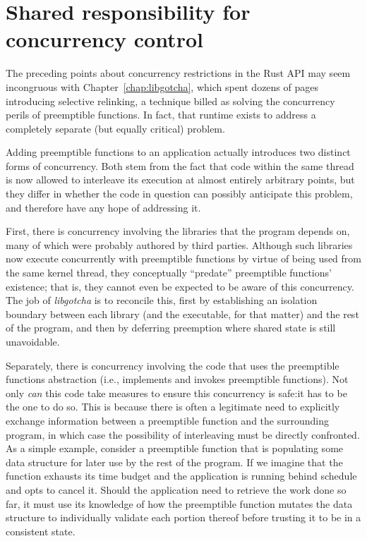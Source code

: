 \section{Shared responsibility for concurrency control}

The preceding points about concurrency restrictions in the Rust API may seem
incongruous with Chapter~\ref{chap:libgotcha}, which spent dozens of pages
introducing selective relinking, a technique billed as solving the concurrency perils
of preemptible functions.  In fact, that runtime exists to address a completely
separate (but equally critical) problem.

Adding preemptible functions to an application actually introduces two distinct forms
of concurrency.  Both stem from the fact that code within the same thread is now
allowed to interleave its execution at almost entirely arbitrary points, but they
differ in whether the code in question can possibly anticipate this problem, and
therefore have any hope of addressing it.

First, there is concurrency involving the libraries that the program depends on, many
of which were probably authored by third parties.  Although such libraries now
execute concurrently with preemptible functions by virtue of being used from the same
kernel thread, they conceptually ``predate'' preemptible functions' existence; that
is, they cannot even be expected to be aware of this concurrency.  The job of
\textit{libgotcha} is to reconcile this, first by establishing an isolation boundary
between each library (and the executable, for that matter) and the rest of the
program, and then by deferring preemption where shared state is still unavoidable.

Separately, there is concurrency involving the code that uses the preemptible
functions abstraction (i.e., implements and invokes preemptible functions).  Not only
\textit{can} this code take measures to ensure this concurrency is safe:\@ it has to
be the one to do so.  This is because there is often a legitimate need to explicitly
exchange information between a preemptible function and the surrounding program, in
which case the possibility of interleaving must be directly confronted.  As a simple
example, consider a preemptible function that is populating some data structure for
later use by the rest of the program.  If we imagine that the function exhausts its
time budget and the application is running behind schedule and opts to cancel it.
Should the application need to retrieve the work done so far, it must use its
knowledge of how the preemptible function mutates the data structure to individually
validate each portion thereof before trusting it to be in a consistent state.

